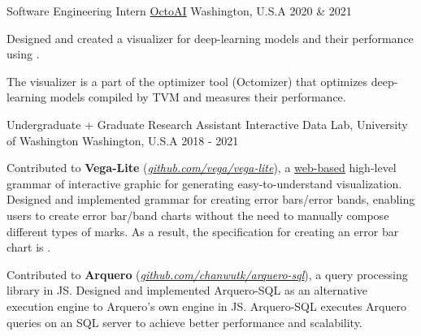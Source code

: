 \begin{cventries}
  \cvwork
    {Software Engineering Intern} %
    {\href{https://www.forbes.com/sites/janakirammsv/2024/09/30/nvidia-acquires-octoai-to-dominate-enterprise-generative-ai-solutions/}{OctoAI}} %
    {Washington, U.S.A} %
    {2020 \& 2021} %
    {
      \begin{cvitems} %
          \item{Designed and created a visualizer for deep-learning models and their performance using \underline{}.}
          \item{The visualizer is a part of the optimizer tool (Octomizer) that optimizes deep-learning models compiled by TVM and measures their performance.}
      \end{cvitems}
    }

  \cvwork
    {Undergraduate + Graduate Research Assistant} %
    {Interactive Data Lab, University of Washington} %
    {Washington, U.S.A} %
    {2018 - 2021} %
    {
      \begin{cvitems} %
        \item {
          Contributed to \textbf{Vega-Lite} (\href{https://www.github.com/vega/vega-lite}{\textit{github.com/vega/vega-lite}}), a \underline{web-based} high-level grammar of interactive graphic for generating easy-to-understand visualization.
          Designed and implemented grammar for creating error bars/error bands,
          enabling users to create error bar/band charts without the need to manually compose different types of marks.
          As a result, the specification for creating an error bar chart is \underline{}.
        }
        \item {
          Contributed to \textbf{Arquero} (\href{https://www.github.com/chanwutk/arquero-sql}{\textit{github.com/chanwutk/arquero-sql}}), a query processing library in JS.
          Designed and implemented Arquero-SQL as an alternative execution engine to Arquero's own engine in JS.
          Arquero-SQL executes Arquero queries on an SQL server to achieve better performance and scalability.
        }
      \end{cvitems}
    }


\end{cventries}
